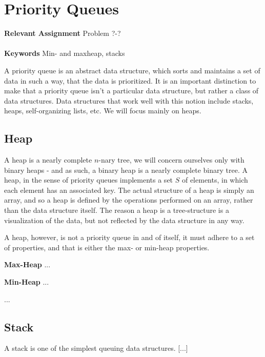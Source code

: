 
\chapter{Priority Queues}
\label{ch:priorityqueues}

\textbf{Relevant Assignment} Problem ?-?\\\\
\textbf{Keywords} Min- and maxheap, stacks
\vspace{1in}

\noindent A priority queue is an abstract data structure, which sorts and
maintains a set of data in such a way, that the data is prioritized. It is an
important distinction to make that a priority queue isn't a particular data
structure, but rather a class of data structures. Data structures that work
well with this notion include stacks, heaps, self-organizing lists, etc.
We will focus mainly on heaps.

\section{Heap}
A heap is a nearly complete $n$-nary tree, we will concern ourselves only with
binary heaps - and as such, a binary heap is a nearly complete binary tree. A
heap, in the sense of priority queues implements a set $S$ of elements, in
which each element has an associated key. The actual structure of a heap is
simply an array, and so a heap is defined by the operations performed on an
array, rather than the data structure itself. The reason a heap is a
tree-structure is a visualization of the data, but not reflected by the data
structure in any way.


A heap, however, is not a priority queue in and of itself, it must adhere to
a set of properties, and that is either the max- or min-heap properties.

\begin{description}
	\item \textbf{Max-Heap} ...
	\item \textbf{Min-Heap} ...
\end{description}
...

\section{Stack}
A stack is one of the simplest queuing data structures. [...]

